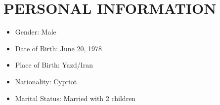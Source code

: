 \documentclass[10pt]{article}
\begin{document}
\renewcommand{\labelitemi}{$\bullet$}

\section{\bf PERSONAL INFORMATION}
\begin{itemize}
\setlength{\itemsep}{0.10ex}
\item  Gender:  Male
\item  Date of Birth: June 20, 1978
\item  Place of Birth:  Yazd/Iran
\item  Nationality:  Cypriot
\item  Marital Status:  Married with 2 children 
\end{itemize}
\end{document}
